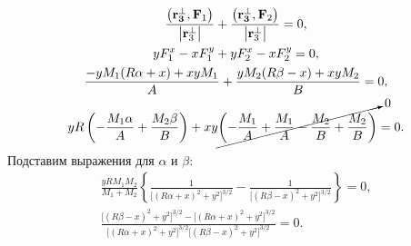 \begin{gather*}
    \frac{ \left( \vec{r_3^\perp},  \vec{F}_1 \right)}{\left| \vec{r}_3^\perp \right|} + \frac{ \left( \vec{r_3^\perp}, \vec{F}_2 \right)}{\left| \vec{r}_3^\perp \right|} = 0,\\
    y F_1^x - x F_1^y + y F_2^x - x F_2^y = 0,\\
    \dfrac{-y M_1 (R\alpha + x ) + x y M_1}{A}    + \frac{y M_2(R\beta - x) + xy M_2}{B}= 0,\\
    yR \left( - \frac{M_1 \alpha}{A} + \frac{M_2 \beta}{B}\right) + xy \cancelto{0}{\left( - \frac{M_1}{A} + \frac{M_1}{A} - \frac{M_2}{B} + \frac{M_2}{B} \right)} = 0.
\end{gather*}
Подставим выражения для $\alpha$ и $\beta$:
\begin{gather*}
    \frac{yRM_1M_2}{M_1 + M_2} \left\{ \frac{1}{\big[ (R \alpha + x)^2 + y^2 \big]^{3/2}} - \frac{1}{\big[ (R \beta - x)^2 + y^2 \big]^{3/2}} \right\} = 0,\\
    \frac{\big[ (R \beta - x)^2 + y^2 \big]^{3/2} - \big[ (R \alpha + x)^2 + y^2 \big]^{3/2}}{\big[ (R \alpha + x)^2 + y^2 \big]^{3/2}\big[ (R \beta - x)^2 + y^2 \big]^{3/2}} = 0.
\end{gather*}
